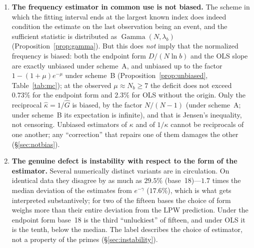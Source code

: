 \documentclass[11pt,a4paper]{article}
\theoremstyle{plain}
\theoremstyle{remark}
\newcommand{\emg}{e^{-\gamma}}
\DeclareMathOperator{\Gam}{Gamma}
\begin{document}
\begin{enumerate}
\item\textbf{The frequency estimator in common use is not biased.} The scheme
in which the fitting interval ends at the largest known index does indeed
condition the estimate on the last observation being an event, and the
sufficient statistic is distributed as $\Gam(N,\lambda_b)$
(Proposition~\ref{prop:gamma}). But this does \emph{not} imply that the
normalized frequency is biased: both the endpoint form $D/(N\ln b)$ and the OLS
slope are exactly unbiased under scheme~A, and unbiased up to the factor
$1-(1+\mu)e^{-\mu}$ under scheme~B (Proposition~\ref{prop:unbiased},
Table~\ref{tab:mc}); at the observed $\mu\approx N_b\ge7$ the deficit does not
exceed $0.73\%$ for the endpoint form and $2.3\%$ for OLS without the origin.
Only the reciprocal $\hat\kappa=1/\hat G$ is biased, by the factor $N/(N-1)$
(under scheme~A; under scheme~B its expectation is infinite), and that is
Jensen's inequality, not censoring. Unbiased estimators of $\kappa$
and of $1/\kappa$ cannot be reciprocals of one another; any ``correction'' that
repairs one of them damages the other (\S\ref{sec:notbias}).

\item\textbf{The genuine defect is instability with respect to the form of the
estimator.} Several numerically distinct variants are in circulation. On
identical data they disagree by as much as $29.5\%$ (base~18)---$1.7$ times the
median deviation of the estimates from $\emg$ ($17.6\%$), which is what gets
interpreted substantively; for two of the fifteen bases the choice of form
weighs more than their entire deviation from the LPW prediction. Under the
endpoint form base~18 is the third ``unluckiest'' of fifteen, and under OLS it
is the tenth, below the median. The label describes the choice of estimator, not
a property of the primes (\S\ref{sec:instability}).


\end{enumerate}
\end{document}

